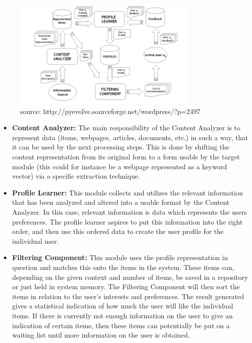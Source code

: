 \begin{figure}[H]
\centering
\includegraphics[width=90mm]{Pictures/contentdescription.png}
\caption{source: http://pyevolve.sourceforge.net/wordpress/?p=2497}
\label{contentdescription}
\end{figure}
\begin{itemize}
	\item \textbf{Content Analyzer:}
	The main responsibility of the Content Analyzer is to represent data (items, webpages, articles, documents, etc.) in such a way, that it can be used by the next processing steps. This is done by shifting the content representation from its original form to a form usable by the target module (this could for instance be a webpage represented as a keyword vector) via a specific extraction technique.
	
	\item \textbf{Profile Learner:} This module collects and utilizes the relevant information that has been analyzed and altered into a usable format by the Content Analyzer. In this case, relevant information is data which represents the users preferences. The profile learner aspires to put this information into the right order, and then use this ordered data to create the user profile for the individual user.
	
	\item \textbf{Filtering Component:} This module uses the profile representation in question and matches this onto the items in the system. These items can, depending on the given context and number of items, be saved in a repository or just held in system memory. The Filtering Component will then sort the items in relation to the user's interests and preferences.\newline
	The result generated gives a statistical indication of how much the user will like the individual items. If there is currently not enough information on the user to give an indication of certain items, then these items can potentially be put on a waiting list until more information on the user is obtained.
\end{itemize}

